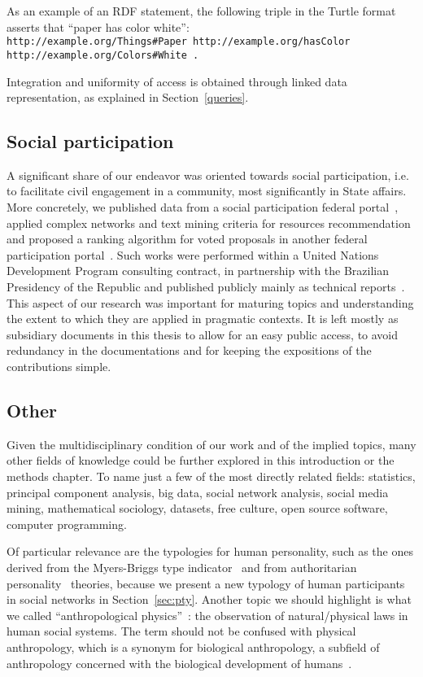 As an example of an RDF statement, the following triple in the Turtle
format asserts that ``paper has color white'':\\
\texttt{http://example.org/Things\#Paper http://example.org/hasColor\\
http://example.org/Colors\#White .}

Integration and uniformity of access is obtained through linked data
representation, as explained in Section~\ref{queries}.

\subsection{Social participation}
A significant share of our endeavor was oriented towards social participation,
i.e. to facilitate civil engagement in a community, most significantly in State affairs.
More concretely, we published data from a social participation federal portal~\cite{losd},
applied complex networks and text mining criteria for resources recommendation~\cite{pnud3,pnud4,opa} and
proposed a ranking algorithm for voted proposals in another federal participation portal~\cite{dialogaAlg}.
Such works were performed within a United Nations Development Program consulting contract,
in partnership with the Brazilian Presidency of the Republic and published publicly mainly as technical reports~\cite{pnud3,pnud4,opa}.
This aspect of our research was important for maturing topics and understanding
the extent to which they are applied in pragmatic contexts.
It is left mostly as subsidiary documents in this thesis to allow for an easy public access,
to avoid redundancy in the documentations and for keeping the expositions of the contributions simple.

\subsection{Other}
Given the multidisciplinary condition of our work and of the implied topics,
many other fields of knowledge could be further explored in this introduction or
the methods chapter.
To name just a few of the most directly related fields: statistics, principal component analysis,
big data, social network analysis, social media mining, mathematical sociology,
datasets, free culture, open source software, computer programming.

Of particular relevance are the typologies for human personality, such as the ones derived
from the Myers-Briggs type indicator~\cite{mb} and from authoritarian personality~\cite{adorno} theories,
because we present a new typology of human participants in social networks in Section~\ref{sec:pty}.
Another topic we should highlight is what we called ``anthropological physics''~\cite{anPhy,antphy2}:
the observation of natural/physical laws in human social systems.
The term should not be confused with physical anthropology, which is a synonym for biological anthropology,
a subfield of anthropology concerned with the biological development of humans~\cite{phyAn}.

